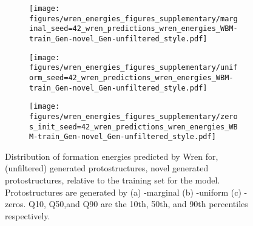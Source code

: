 \begin{figure*}[h!]
    \centering
    \begin{subfigure}[t]{0.33\linewidth}
        \centering
        \texttt{[image: figures/wren\_energies\_figures\_supplementary/marginal\_seed=42\_wren\_predictions\_wren\_energies\_WBM-train\_Gen-novel\_Gen-unfiltered\_style.pdf]}
        \caption{}
    \end{subfigure}%
    \hfill
    \begin{subfigure}[t]{0.33\linewidth}
        \centering
        \texttt{[image: figures/wren\_energies\_figures\_supplementary/uniform\_seed=42\_wren\_predictions\_wren\_energies\_WBM-train\_Gen-novel\_Gen-unfiltered\_style.pdf]}
        \caption{}
    \end{subfigure}
    \hfill
    \begin{subfigure}[t]{0.33\linewidth}
        \centering
        \texttt{[image: figures/wren\_energies\_figures\_supplementary/zeros\_init\_seed=42\_wren\_predictions\_wren\_energies\_WBM-train\_Gen-novel\_Gen-unfiltered\_style.pdf]}
        \caption{}
    \end{subfigure}
    \caption{Distribution of formation energies predicted by Wren for, (unfiltered) generated protostructures, novel generated protostructures, relative to the training set for the model. Protostructures are generated by (a) \ourmodel-marginal (b) \ourmodel-uniform (c) \ourmodel-zeros. Q10, Q50,and  Q90 are the 10th, 50th, and 90th percentiles respectively.}
    \label{fig:wren-energies-supplementary}
\end{figure*}
